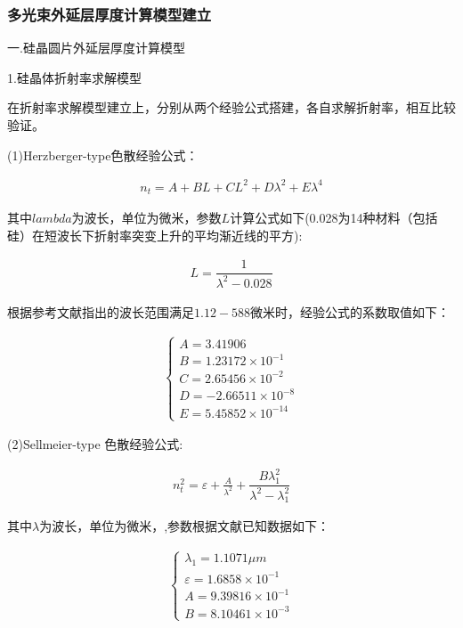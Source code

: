 \documentclass[UTF8]{ctexart}
\begin{document}
\subsubsection{多光束外延层厚度计算模型建立}
一.硅晶圆片外延层厚度计算模型\par 
1.硅晶体折射率求解模型\par 
在折射率求解模型建立上，分别从两个经验公式搭建，各自求解折射率，相互比较验证。\par 
(1)Herzberger-type色散经验公式：\par 
\begin{align}
	n_t=A+BL+CL^2+D\lambda^2+E\lambda^4
\end{align}\par 
其中$lambda$为波长，单位为微米，参数$L$计算公式如下(0.028为14种材料（包括硅）在短波长下折射率突变上升的平均渐近线的平方):\par 
\begin{align}
	L=\dfrac{1}{\lambda^2-0.028}
\end{align}\par 
根据参考文献指出的波长范围满足$1.12-588$微米时，经验公式的系数取值如下：\par 
\begin{align}
	\begin{cases}
		A=3.41906\\
		B=1.23172\times 10^{-1}\\
		C=2.65456\times 10^{-2}\\
		D=-2.66511\times 10^{-8}\\
		E=5.45852\times 10^{-14}
	\end{cases}
\end{align}\par 
(2)Sellmeier-type 色散经验公式:\par 
\begin{align}
	n_t^2=\varepsilon+\frac{A}{\lambda^2}+\dfrac{B\lambda_1^2}{\lambda^2-\lambda_1^2}
\end{align}\par 
其中$\lambda$为波长，单位为微米，,参数根据文献已知数据如下：\par 
\begin{align}
	\begin{cases}
		\lambda_1=1.1071\mu m\\
		\varepsilon=1.6858\times{10}^{-1}\\
		A=9.39816\times{10}^{-1}\\
		B=8.10461\times{10}^{-3}
	\end{cases}
\end{align}\par 
\end{document}
